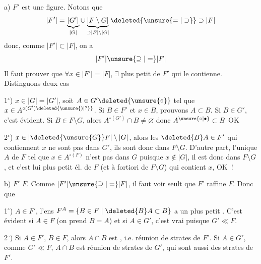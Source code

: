 a) $F'$ est une figure.  Notons que 
\[
 |F'|=\underbrace{|G'|}_{|G|}\cup\underbrace{|F\setminus G|}_{\supset |F|\setminus |G|}\deleted{\unsure{=|\supset}}\supset |F|
\]
donc, comme $|F'|\subset |F|$, on a
\[
 |F'|\unsure{\supseteq|=}|F|
\]
Il faut prouver que $\forall x\in |F'|=|F|$, $\exists$ plus petit  de $F'$ qui le contienne. Distinguons deux cas

1$^\circ$) $x\in |G|=|G'|$, soit $A\in G'\deleted{\unsure{\circ}}$ tel que $x\in A^{\circ(G')\deleted{\unsure{)|?}}}$. Si $B\in F'$ et  $x\in B$, prouvons $A\subset B$. Si $B\in G'$, c'est évident. Si $B\in F\setminus G$, alors  $A^{\circ(G')}\cap B\ne\varnothing$ donc $A^{\unsure{\circ|\bullet}}\subset B$ OK

2$^\circ$) $x\in |\deleted{\unsure{G}}F|\setminus |G|$, alors les $\deleted{B}A\in F'$ qui contiennent $x$ ne sont pas dans $G'$, ils sont donc dans $F\setminus G$. D'autre part, l'unique  $A$ de $F$ tel que $x\in A^{\circ(F)}$ n'est pas dans $G$ puisque $x\notin |G|$, il est donc dans $F\setminus G$, et  c'est lui plus petit él. de $F$ (et à fortiori de $F\setminus G$) qui contient $x$, OK~!

b) $F'$  $F$. Comme $|F'|\unsure{\supseteq|=}|F|$, il faut voir seult que $F'$ raffine $F$. Donc  que

1$^\circ$) \deleted{$\forall$} $A\in F'$, l'ens $F^A=\{B\in F\mid \deleted{B}A\subset B\}$ a un plus petit . C'est évident si $A\in F$  (on prend $B=A$) et si $A\in G'$, c'est vrai puisque $G'\ll F$.

2$^\circ$) Si $A\in F'$, $B\in F$, alors $A\cap B$ est , i.e. réunion de strates de $F'$. Si $A\in G'$, comme $G'\ll F$, $A\cap B$ est réunion de strates de $G'$, qui sont aussi des strates de $F'$.
